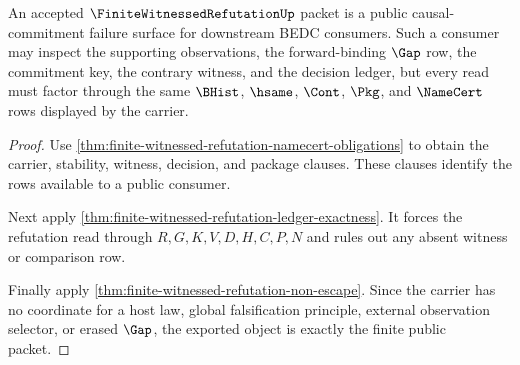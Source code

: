\begin{theorem}
\label{thm:finite-witnessed-refutation-public-packet}
An accepted $\FiniteWitnessedRefutationUp$ packet is a public causal-commitment failure surface for downstream BEDC consumers. Such a consumer may inspect the supporting observations, the forward-binding $\Gap$ row, the commitment key, the contrary witness, and the decision ledger, but every read must factor through the same $\BHist$, $\hsame$, $\Cont$, $\Pkg$, and $\NameCert$ rows displayed by the carrier.
\end{theorem}
\begin{proof}
Use \autoref{thm:finite-witnessed-refutation-namecert-obligations} to obtain the carrier, stability, witness, decision, and package clauses. These clauses identify the rows available to a public consumer.

Next apply \autoref{thm:finite-witnessed-refutation-ledger-exactness}. It forces the refutation read through $R,G,K,V,D,H,C,P,N$ and rules out any absent witness or comparison row.

Finally apply \autoref{thm:finite-witnessed-refutation-non-escape}. Since the carrier has no coordinate for a host law, global falsification principle, external observation selector, or erased $\Gap$, the exported object is exactly the finite public packet.
\end{proof}

